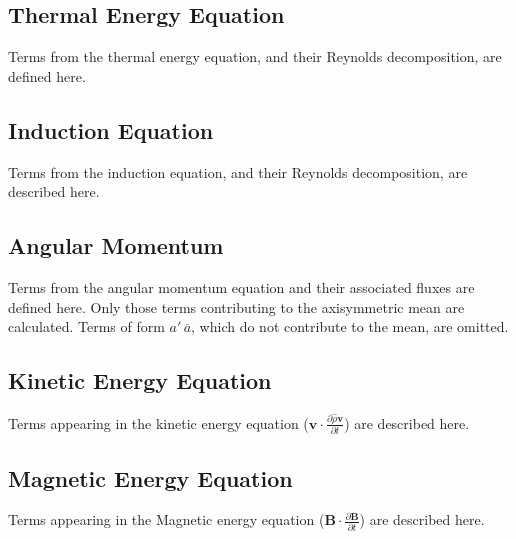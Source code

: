 \documentclass[10pt,letterpaper]{article}
\begin{document}



\subsection{Thermal Energy Equation}
Terms from the thermal energy equation, and their Reynolds decomposition, are defined here.




\subsection{Induction Equation}
Terms from the induction equation, and their Reynolds decomposition, are described here.




\subsection{Angular Momentum}
Terms from the angular momentum equation and their associated fluxes are defined here.  Only those terms contributing to the axisymmetric mean are calculated.  Terms of form $a'\,\overline{a}$, which do not contribute to the mean, are omitted.




\subsection{Kinetic Energy Equation}
Terms appearing in the kinetic energy equation ($\boldsymbol{v}\cdot\frac{\partial \hat{\rho}\boldsymbol{v}}{\partial t}$) are described here.





\subsection{Magnetic Energy Equation}
Terms appearing in the Magnetic energy equation ($\boldsymbol{B}\cdot\frac{\partial \boldsymbol{B}}{\partial t}$) are described here.



\end{document}

